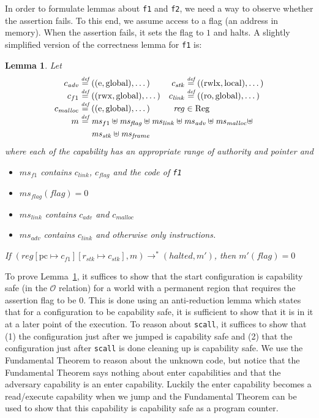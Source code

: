 \documentclass[compsoc,conference,letterpaper,fleqn]{IEEEtran}
\newtheorem{lemma}{Lemma}
\newcommand{\update}[2]{[#1 \mapsto #2]}
\newcommand{\defeq}{\stackrel{\textit{\tiny{def}}}{=}}
\newcommand{\var}[1]{\mathit{#1}}
\newcommand{\hs}{\var{ms}}
\newcommand{\ms}{\hs}
\newcommand{\pcreg}{\mathrm{pc}}
\newcommand{\reg}{\var{reg}}
\newcommand{\adv}{\var{adv}}
\newcommand{\link}{\var{link}}
\newcommand{\stk}{\var{stk}}
\newcommand{\flag}{\var{flag}}
\newcommand{\halted}{\mathit{halted}}
\newcommand{\codelabel}[1]{\mathit{#1}}
\newcommand{\malloc}{\codelabel{malloc}}
\newcommand{\plaindom}[1]{\mathrm{#1}}
\newcommand{\Regs}{\plaindom{Reg}}
\newcommand{\observations}{\mathcal{O}}
\newcommand{\plainperm}[1]{\mathrm{#1}}
\newcommand{\readonly}{\plainperm{ro}}
\newcommand{\entry}{\plainperm{e}}
\newcommand{\rwx}{\plainperm{rwx}}
\newcommand{\rwlx}{\plainperm{rwlx}}
\newcommand{\local}{\plainperm{local}}
\newcommand{\glob}{\plainperm{global}}
\newcommand{\step}[1][]{\rightarrow_{#1}}
\begin{document}
In order to formulate lemmas about \texttt{f1} and \texttt{f2}, we
need a way to observe whether the assertion fails. To this end, we
assume access to a flag (an address in memory). When the assertion
fails, it sets the flag to $1$ and halts. A slightly simplified
version of the correctness lemma for \texttt{f1} is:
\begin{lemma}
  \label{lem:correctness-f1}
  Let
\[
    \begin{array}{r@{}lr@{}l}
    c_{\var{adv}} & \;\defeq ((\entry,\glob),\dots) & c_{\var{stk}} & \;\defeq ((\rwlx,\local),\dots)\\
    c_{f1} & \;\defeq ((\rwx,\glob),\dots) & c_\link &\; \defeq ((\readonly,\glob),\dots)\\
    c_\malloc &\; \defeq ((\entry,\glob),\dots) & \reg& \; \in \Regs \\
    m &  \multicolumn{3}{@{}l}{\;\defeq \ms_{f1} \uplus \ms_\flag \uplus \ms_{\var{link}} \uplus \hs_\adv \uplus \ms_{\malloc} \uplus} \\
      & \multicolumn{3}{@{}l}{\phantom{\;\defeq \;}  \ms_{\var{stk}} \uplus \ms_{\var{frame}}} \\
    \end{array}
\]
  where each of the capability has an appropriate range of authority and pointer and
  \begin{itemize}
  \item $\ms_{f1}$ contains $c_\link$, $c_\flag$ and the code of \texttt{f1}
  \item $\ms_\flag(\flag) = 0$
  \item $\ms_{\var{link}}$ contains $c_\adv$ and $c_\malloc$
  \item $\hs_\adv$ contains $c_\link$ and otherwise only instructions.
  \end{itemize}
  If $(\reg\update{\pcreg}{c_{f1}}\update{r_\stk}{c_\stk},m) \step^* (\halted,m')$,
  then $m'(\flag) = 0$
\end{lemma}

To prove Lemma~\ref{lem:correctness-f1}, it suffices to show that the
start configuration is capability safe (in the $\observations$
relation) for a world with a permanent region that requires the
assertion flag to be 0. This is done using an anti-reduction lemma
which states that for a configuration to be capability safe, it is
sufficient to show that it is in it at a later point of the
execution. To reason about \texttt{scall}, it suffices to show that
(1) the configuration just after we jumped is capability safe and (2)
that the configuration just after \texttt{scall} is done cleaning up
is capability safe.  We use the Fundamental Theorem to reason about
the unknown code, but notice that the Fundamental Theorem says nothing
about enter capabilities and that the adversary capability is an enter
capability. Luckily the enter capability becomes a read/execute
capability when we jump and the Fundamental Theorem can be used to
show that this capability is capability safe as a program counter.
\end{document}
